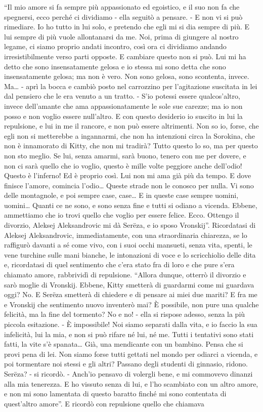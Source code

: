 ``Il mio amore si fa sempre più appassionato ed egoistico, e il suo non fa che spegnersi, ecco perché ci dividiamo - ella seguitò a pensare. - E non vi si può rimediare. Io ho tutto in lui solo, e pretendo che egli mi si dia sempre di più. E lui sempre di più vuole allontanarsi da me. Noi, prima di giungere al nostro legame, ci siamo proprio andati incontro, così ora ci dividiamo andando irresistibilmente verso parti opposte. E cambiare questo non si può. Lui mi ha detto che sono insensatamente gelosa e io stessa mi sono detta che sono insensatamente gelosa; ma non è vero. Non sono gelosa, sono scontenta, invece. Ma\ldots{} - aprì la bocca e cambiò posto nel carrozzino per l'agitazione suscitata in lei dal pensiero che le era venuto a un tratto. - S'io potessi essere qualcos'altro, invece dell'amante che ama appassionatamente le sole sue carezze; ma io non posso e non voglio essere null'altro. E con questo desiderio io suscito in lui la repulsione, e lui in me il rancore, e non può essere altrimenti. Non so io, forse, che egli non si metterebbe a ingannarmi, che non ha intenzioni circa la Sorokina, che non è innamorato di Kitty, che non mi tradirà? Tutto questo lo so, ma per questo non sto meglio. Se lui, senza amarmi, sarà buono, tenero con me per dovere, e non ci sarà quello che io voglio, questo è mille volte peggiore anche dell'odio! Questo è l'inferno! Ed è proprio così. Lui non mi ama già più da tempo. E dove finisce l'amore, comincia l'odio\ldots{} Queste strade non le conosco per nulla. Vi sono delle montagnole, e poi sempre case, case\ldots{} E in queste case sempre uomini, uomini\ldots{} Quanti ce ne sono, e sono senza fine e tutti si odiano a vicenda. Ebbene, ammettiamo che io trovi quello che voglio per essere felice. Ecco. Ottengo il divorzio, Aleksej Aleksandrovic mi dà Serëza, e io sposo Vronskij''. Ricordatasi di Aleksej Aleksandrovic, immediatamente, con una straordinaria chiarezza, se lo raffigurò davanti a sé come vivo, con i suoi occhi mansueti, senza vita, spenti, le vene turchine sulle mani bianche, le intonazioni di voce e lo scricchiolio delle dita e, ricordatasi di quel sentimento che c'era stato fra di loro e che pure s'era chiamato amore, rabbrividì di repulsione. ``Allora dunque, otterrò il divorzio e sarò moglie di Vronskij. Ebbene, Kitty smetterà di guardarmi come mi guardava oggi? No. E Serëza smetterà di chiedere e di pensare ai miei due mariti? E fra me e Vronskij che sentimento nuovo inventerò mai? È possibile, non pure una qualche felicità, ma la fine del tormento? No e no! - ella si rispose adesso, senza la più piccola esitazione. - È impossibile! Noi siamo separati dalla vita, e io faccio la sua infelicità, lui la mia, e non si può rifare né lui, né me. Tutti i tentativi sono stati fatti, la vite s'è spanata\ldots{} Già, una mendicante con un bambino. Pensa che si provi pena di lei. Non siamo forse tutti gettati nel mondo per odiarci a vicenda, e poi tormentare noi stessi e gli altri? Passano degli studenti di ginnasio, ridono. Serëza? - si ricordò. - Anch'io pensavo di volergli bene, e mi commovevo dinanzi alla mia tenerezza. E ho vissuto senza di lui, e l'ho scambiato con un altro amore, e non mi sono lamentata di questo baratto finché mi sono contentata di quest'altro amore''. E ricordò con repulsione quello che chiamava 